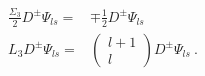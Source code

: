 \begin{equation}
\begin{array}{cc}
\frac{\Sigma _{3}}{2}D^{\pm }\Psi _{ls}= & \mp \frac{1}{2}D^{\pm }\Psi _{ls} \\
L_{3}D^{\pm }\Psi _{ls}= & \left(
\begin{array}{c}
l+1 \\
l
\end{array}
\right) D^{\pm }\Psi _{ls}\ .
\end{array}
\label{eq37}
\end{equation}

